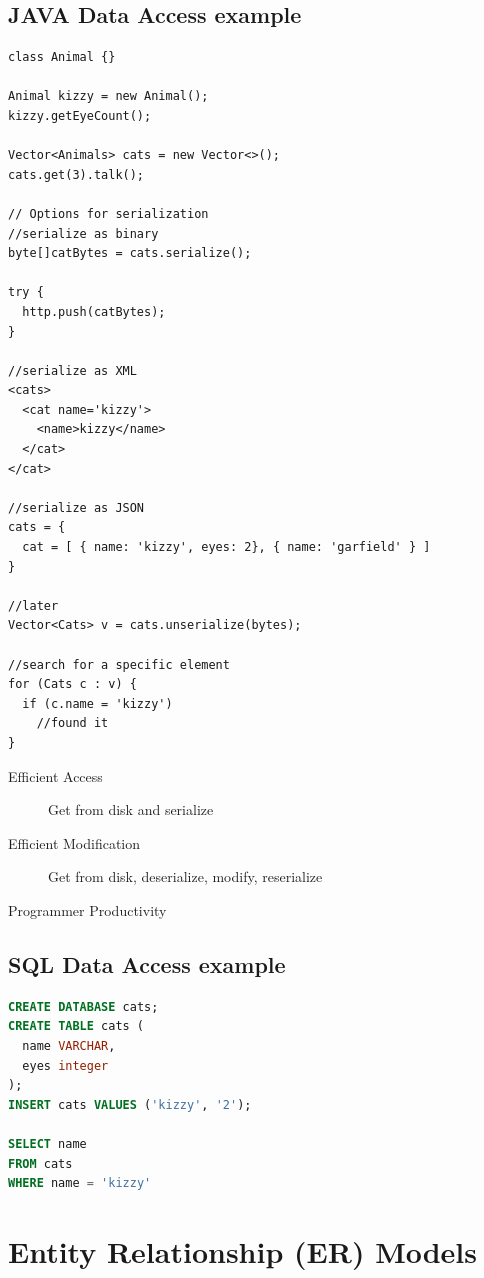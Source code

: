 \documentclass{article}
\begin{document}
\subsection{JAVA Data Access example}
\begin{lstlisting}
class Animal {}

Animal kizzy = new Animal();
kizzy.getEyeCount();

Vector<Animals> cats = new Vector<>();
cats.get(3).talk();

// Options for serialization
//serialize as binary 
byte[]catBytes = cats.serialize();

try {
  http.push(catBytes);
}

//serialize as XML 
<cats>
  <cat name='kizzy'>
    <name>kizzy</name>
  </cat>
</cat>

//serialize as JSON
cats = {
  cat = [ { name: 'kizzy', eyes: 2}, { name: 'garfield' } ]
}

//later
Vector<Cats> v = cats.unserialize(bytes);

//search for a specific element
for (Cats c : v) {
  if (c.name = 'kizzy')
    //found it
}

\end{lstlisting}

\begin{description}
  \item[Efficient Access]{Get from disk and serialize}
  \item[Efficient Modification]{Get from disk, deserialize, modify, reserialize}
  \item[Programmer Productivity]{}
\end{description}

\subsection{SQL Data Access example}
\begin{samepage}
  \begin{lstlisting}[language=SQL]
CREATE DATABASE cats;
CREATE TABLE cats (
  name VARCHAR,
  eyes integer
);
INSERT cats VALUES ('kizzy', '2');

SELECT name
FROM cats
WHERE name = 'kizzy'
\end{lstlisting}
\end{samepage}

\section{Entity Relationship (ER) Models}
\end{document}
